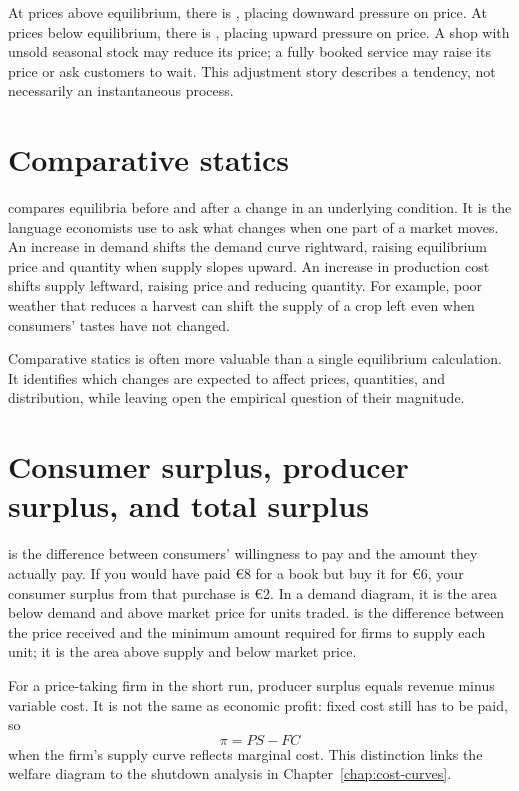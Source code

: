 At prices above equilibrium, there is , placing
downward pressure on price. At prices below equilibrium, there is
, placing upward pressure on price. A shop with
unsold seasonal stock may reduce its price; a fully booked service may raise
its price or ask customers to wait. This adjustment story describes a
tendency, not necessarily an instantaneous process.

\section{Comparative statics}

 compares equilibria before and after a change in
an underlying condition. It is the language economists use to ask what changes
when one part of a market moves. An increase in demand shifts the demand curve
rightward, raising equilibrium price and quantity when supply slopes upward.
An increase in production cost shifts supply leftward, raising price and
reducing quantity. For example, poor weather that reduces a harvest can shift
the supply of a crop left even when consumers' tastes have not changed.

Comparative statics is often more valuable than a single equilibrium
calculation. It identifies which changes are expected to affect prices,
quantities, and distribution, while leaving open the empirical question of
their magnitude.

\section{Consumer surplus, producer surplus, and total surplus}

 is the difference between consumers' willingness to
pay and the amount they actually pay. If you would have paid \euro8 for a
book but buy it for \euro6, your consumer surplus from that purchase is
\euro2. In a demand diagram, it is the area below demand and above market
price for units traded.  is the difference between
the price received and the minimum amount required for firms to supply each
unit; it is the area above supply and below market price.

For a price-taking firm in the short run, producer surplus equals revenue minus
variable cost. It is not the same as economic profit: fixed cost still has to
be paid, so
\[
\pi=PS-FC
\]
when the firm's supply curve reflects marginal cost. This distinction links
the welfare diagram to the shutdown analysis in Chapter~\ref{chap:cost-curves}.

